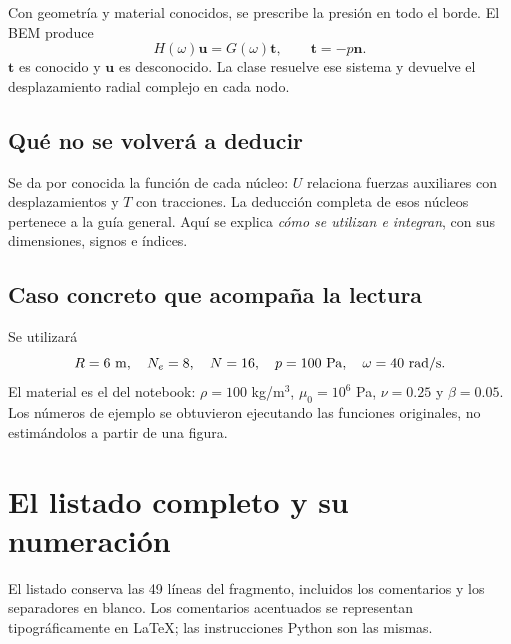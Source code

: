 \documentclass[11pt,a4paper]{article}
\numberwithin{equation}{section}
\newcommand{\vect}[1]{\bm{#1}}
\begin{document}
\begin{idea}
Con geometr\'ia y material conocidos, se prescribe la presi\'on en todo
el borde. El BEM produce
\begin{equation}
 \boxed{H(\omega)\vect u=G(\omega)\vect t,\qquad
 \vect t=-p\vect n.}
 \label{eq:sistema}
\end{equation}
$\vect t$ es conocido y $\vect u$ es desconocido. La clase resuelve ese
sistema y devuelve el desplazamiento radial complejo en cada nodo.
\end{idea}

\subsection{Qu\'e no se volver\'a a deducir}
Se da por conocida la funci\'on de cada n\'ucleo:
$U$ relaciona fuerzas auxiliares con desplazamientos y $T$ con tracciones.
La deducci\'on completa de esos n\'ucleos pertenece a la gu\'ia general.
Aqu\'i se explica \emph{c\'omo se utilizan e integran}, con sus dimensiones,
signos e \'indices.

\subsection{Caso concreto que acompa\~na la lectura}
Se utilizar\'a
\begin{equation}
 R=6\ {\rm m},\quad N_e=8,\quad N=16,\quad
 p=100\ {\rm Pa},\quad\omega=40\ {\rm rad/s}.
\end{equation}
El material es el del notebook:
$\rho=100$ kg/m$^3$, $\mu_0=10^6$ Pa, $\nu=0.25$ y $\beta=0.05$.
Los n\'umeros de ejemplo se obtuvieron ejecutando las funciones originales,
no estim\'andolos a partir de una figura.

\clearpage
\section{El listado completo y su numeraci\'on}
\label{sec:listado}
El listado conserva las 49 l\'ineas del fragmento, incluidos los comentarios
y los separadores en blanco. Los comentarios acentuados se representan
tipogr\'aficamente en \LaTeX{}; las instrucciones Python son las mismas.
\end{document}

